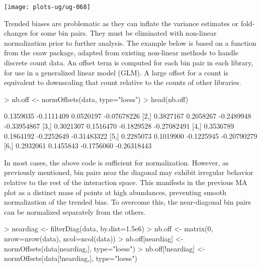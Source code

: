 \documentclass[12pt]{report}
\renewenvironment{Schunk}{\vspace{0pt}}{\vspace{0pt}}
\newcommand{\csaw}{csaw}
\begin{document}
\begin{center}
\texttt{[image: plots-ug/ug-068]}
\end{center}

Trended biases are problematic as they can inflate the variance estimates or fold-changes for some bin pairs. 
They must be eliminated with non-linear normalization prior to further analysis.
The example below is based on a function from the \csaw{} package, adapted from existing non-linear methods to handle discrete count data. %
An offset term is computed for each bin pair in each library, for use in a generalized linear model (GLM). 
A large offset for a count is equivalent to downscaling that count relative to the counts of other libraries. 

\begin{Schunk}
\begin{Sinput}
> nb.off <- normOffsets(data, type="loess")
> head(nb.off)
\end{Sinput}
\begin{Soutput}
          [,1]       [,2]       [,3]        [,4]
[1,] 0.1359035 -0.1111409  0.0520197 -0.07678226
[2,] 0.3827167  0.2058267 -0.2489948 -0.33954867
[3,] 0.3021307  0.1516470 -0.1829528 -0.27082491
[4,] 0.3536789  0.1864192 -0.2252649 -0.31483322
[5,] 0.2285073  0.1019900 -0.1225945 -0.20790279
[6,] 0.2932061  0.1455843 -0.1756060 -0.26318443
\end{Soutput}
\end{Schunk}

In most cases, the above code is sufficient for normalization.
However, as previously mentioned, bin pairs near the diagonal may exhibit irregular behavior relative to the rest of the interaction space.
This manifests in the previous MA plot as a distinct mass of points at high abundances, preventing smooth normalization of the trended bias.
To overcome this, the near-diagonal bin pairs can be normalized separately from the others.

\begin{Schunk}
\begin{Sinput}
> neardiag <- filterDiag(data, by.dist=1.5e6)
> nb.off <- matrix(0, nrow=nrow(data), ncol=ncol(data))
> nb.off[neardiag] <- normOffsets(data[neardiag,], type="loess")
> nb.off[!neardiag] <- normOffsets(data[!neardiag,], type="loess")
\end{Sinput}
\end{Schunk}
\end{document}
